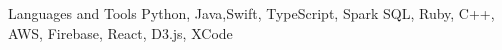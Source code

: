 

\begin{cvskills}

  \cvskill
  {Languages and Tools} %
  {Python, Java,Swift, TypeScript, Spark SQL, Ruby, C++, AWS, Firebase, React, D3.js, XCode} %

\end{cvskills}
